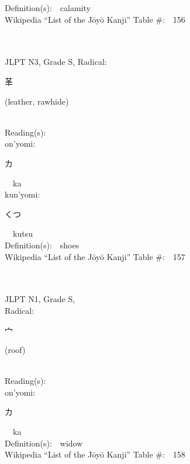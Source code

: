 \begin{multicols}{2}
Definition(s):\ \ calamity \\
Wikipedia ``List of the J\=oy\=o Kanji'' Table \#:\ \ 156 \\
\ \ \\
{\fontsize{34pt}{40pt}  }\ \ \\  %
{JLPT N3, Grade S, Radical:\ \ {\begin{CJK}{UTF8}{min} 革 \end{CJK}} (leather, rawhide) } \\
Reading(s):\ \ \\
{\hspace*{1em}}on'yomi:\ \ \\
{\hspace*{2em}}{\begin{CJK}{UTF8}{min} カ \end{CJK}}\ \ ka\ \ \\
{\hspace*{1em}}kun'yomi:\ \ \\
{\hspace*{2em}}{\begin{CJK}{UTF8}{min} くつ \end{CJK}}\ \ kutsu\ \ \\
Definition(s):\ \ shoes \\
Wikipedia ``List of the J\=oy\=o Kanji'' Table \#:\ \ 157 \\
\ \ \\
{\fontsize{34pt}{40pt}  }\ \ \\
{JLPT N1, Grade S, \\Radical:\ \ {\begin{CJK}{UTF8}{min} 宀 \end{CJK}} (roof) } \\
Reading(s):\ \ \\
{\hspace*{1em}}on'yomi:\ \ \\
{\hspace*{2em}}{\begin{CJK}{UTF8}{min} カ \end{CJK}}\ \ ka\ \ \\
Definition(s):\ \ widow \\
Wikipedia ``List of the J\=oy\=o Kanji'' Table \#:\ \ 158 \\

\end{multicols}
